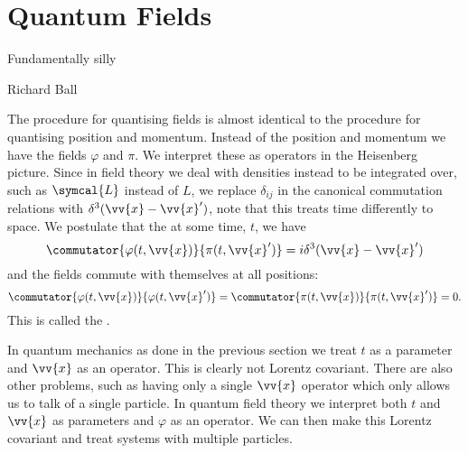 \documentclass[fleqn]{NotesClass}
\newcommand{\lagrangian}{L}
\newcommand{\lagrangianDensity}{\symcal{L}}
\begin{document}
    \section{Quantum Fields}
    \epigraph{Fundamentally silly}{Richard Ball}
    The procedure for quantising fields is almost identical to the procedure for quantising position and momentum.
    Instead of the position and momentum we have the fields \(\varphi\) and \(\pi\).
    We interpret these as operators in the Heisenberg picture.
    Since in field theory we deal with densities instead to be integrated over, such as \(\lagrangianDensity\) instead of \(\lagrangian\), we replace \(\delta_{ij}\) in the canonical commutation relations with \(\delta^3(\vv{x} - \vv{x}')\), note that this treats time differently to space.
    We postulate that the at some time, \(t\), we have
    \begin{equation}
        \commutator{\varphi(t, \vv{x})}{\pi(t, \vv{x}')} = i\delta^3(\vv{x} - \vv{x}')
    \end{equation}
    and the fields commute with themselves at all positions:
    \begin{equation}
        \commutator{\varphi(t, \vv{x})}{\varphi(t, \vv{x}')} = \commutator{\pi(t, \vv{x})}{\pi(t, \vv{x}')} = 0.
    \end{equation}
    This is called the .
    
    In quantum mechanics as done in the previous section we treat \(t\) as a parameter and \(\vv{x}\) as an operator.
    This is clearly not Lorentz covariant.
    There are also other problems, such as having only a single \(\vv{x}\) operator which only allows us to talk of a single particle.
    In quantum field theory we interpret both \(t\) and \(\vv{x}\) as parameters and \(\varphi\) as an operator.
    We can then make this Lorentz covariant and treat systems with multiple particles.
    
\end{document}
